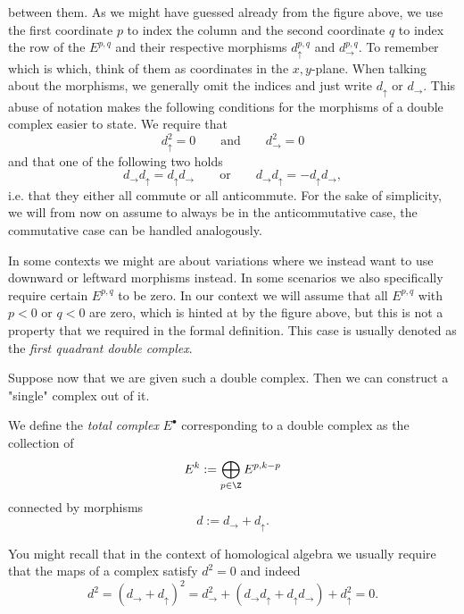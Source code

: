 \begin{definition}
between them. As we might have guessed already from the figure  above, we use the first coordinate $p$ to index the column and the second coordinate $q$ to index the row of the $E^{p,q}$ and their respective morphisms $ d_{\uparrow}^{p,q}$ and $ d_{\rightarrow}^{p,q}$. To remember which is which, think of them as coordinates in the $x,y$-plane. When talking about the morphisms, we generally omit the indices and just write $d_{\uparrow}$ or  $d_{\rightarrow}$. This abuse of notation makes the following conditions for the morphisms of a double complex easier to state. We require that
\begin{equation*}
     d_{\uparrow}^2  = 0 \qquad \text{and} \qquad d_{\rightarrow}^2  = 0
\end{equation*}
and that one of the following two holds
\begin{equation*}
    d_{\rightarrow}d_{\uparrow } = d_{\uparrow}d_{\rightarrow} \qquad \text{or}\qquad d_{\rightarrow}d_{\uparrow } = - d_{\uparrow}d_{\rightarrow},
\end{equation*}
i.e. that they either all commute or all anticommute. For the sake of simplicity, we will from now on assume to always be in the anticommutative case, the commutative case can be handled analogously.
\end{definition}

\begin{remark}
    In some contexts we might are about variations where we instead want to use downward or leftward morphisms instead. In some scenarios we also specifically require certain $E^{p,q}$ to be zero. In our context we will assume that all $E^{p,q}$ with $p<0$ or $q<0$ are zero, which is hinted at by the figure above, but this is not  a property that we required in the formal definition. This case is usually denoted as the \textit{first quadrant double complex}\label{firstquadrantdoublecomplex}. 
\end{remark}

Suppose now that we are given such a double complex. Then we can construct a "single" complex out of it.
\begin{definition}
We define the \textit{total complex} $E^\bullet$ corresponding to a double complex as the collection of
\begin{equation*}
    E^k := \bigoplus_{p\in \Z} E^{p, k-p}
\end{equation*}
connected by morphisms
\begin{equation*}
    d := d_\rightarrow+ d_\uparrow.
\end{equation*}

You might recall that in the context of homological algebra we usually require that the maps of a complex satisfy $d^2 = 0$ and indeed
\begin{equation*}
    d^2 = (d_\rightarrow+d_\uparrow)^2 = d^2_\rightarrow + (d_\rightarrow d_\uparrow + d_\uparrow d_\rightarrow) + d_\uparrow^2 = 0.
\end{equation*}
\end{definition}

